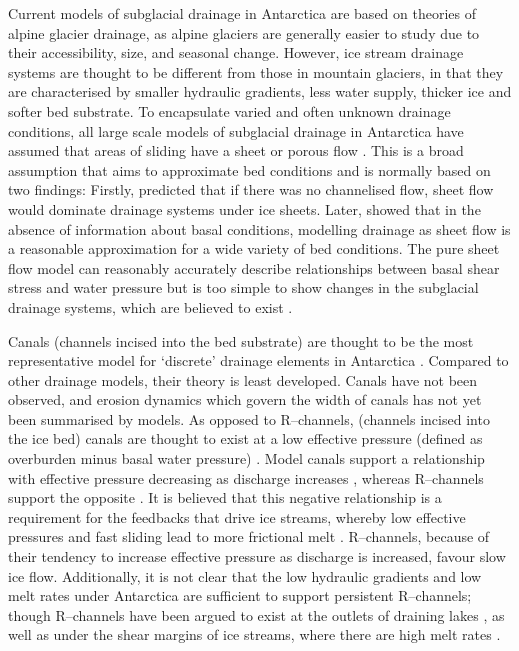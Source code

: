 Current  models of subglacial  drainage in Antarctica are based on theories of alpine glacier  drainage, as alpine glaciers are generally easier to study due to their accessibility, size, and seasonal change. However, ice stream drainage systems are thought to be different from those in mountain glaciers, in that they are characterised by smaller hydraulic gradients, less water supply, thicker ice and softer bed substrate.
To encapsulate varied and often unknown drainage conditions, all large scale models of subglacial drainage in Antarctica have assumed that areas of sliding have a sheet or porous flow \citep{flowers2015modelling}. This is a broad assumption that aims to approximate bed conditions and is normally based on two findings: Firstly, \citet{alley1989water} predicted that if there was no channelised flow, sheet flow would dominate drainage systems under ice sheets. Later, \citet{alley1996towards} showed that in the absence of information about basal conditions, modelling drainage as sheet flow is a reasonable approximation for a wide variety of bed conditions. The \citet{alley1996towards} pure sheet flow model can reasonably accurately describe relationships between basal shear stress and water pressure but is too simple to show changes in the subglacial drainage systems, which are believed to exist \citep[e.g.][]{schroeder2013evidence}.

Canals (channels incised into the bed substrate) are thought to be the most representative model for `discrete' drainage elements in Antarctica \citep[e.g.][]{walder1994channelized,simkins2017anatomy}. Compared to other drainage models, their theory is least developed. Canals have not been observed, and erosion dynamics which govern the width of canals has not yet been summarised by models. As opposed to R--channels, (channels incised into the ice bed) canals are thought to exist at a low effective pressure (defined as overburden
minus basal water pressure) \citep{walder1994channelized}. Model canals support a relationship with effective pressure decreasing as discharge increases \citep{walder1994channelized,ng1998mathematical}, whereas R--channels support the opposite  \citep{rothlisberger1972water,shreve1972movement}. 
It is believed that this negative relationship is a requirement for the feedbacks that drive ice streams, whereby low effective pressures and fast sliding lead to more frictional melt \citep{fowler1996ice}.
R--channels, because of their tendency to 
increase effective pressure as discharge is increased, favour slow ice flow. 
Additionally, it is not clear that the low hydraulic gradients and low melt rates under Antarctica are sufficient to support persistent R--channels; though R--channels have been argued to exist at the outlets of draining lakes \citep{evatt2006subglacial,pattyn2008investigating}, as well as under the shear margins of ice streams, where there are high melt rates \citep{perol2011control}. 

